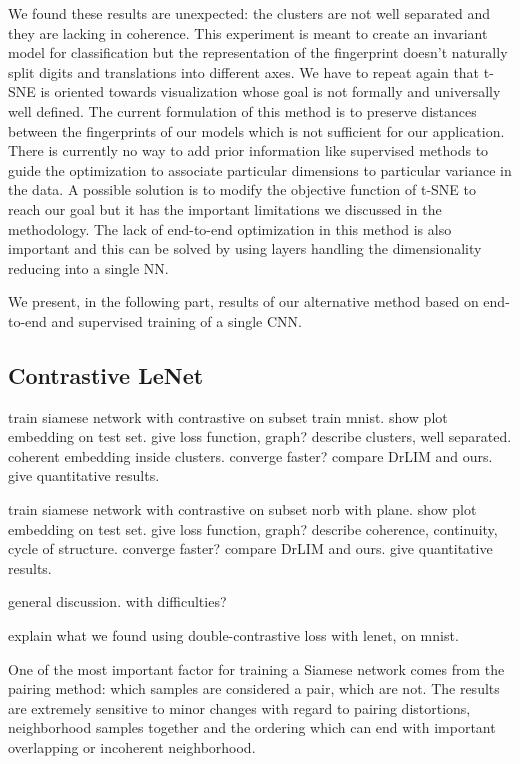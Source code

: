 \documentclass[a4paper,12pt]{report}
\begin{document}
We found these results are unexpected: the clusters are not well separated and they are lacking in coherence.
This experiment is meant to create an invariant model for classification but the representation of the fingerprint doesn't naturally split digits and translations into different axes.
We have to repeat again that t-SNE is oriented towards visualization whose goal is not formally and universally well defined.
The current formulation of this method is to preserve distances between the fingerprints of our models which is not sufficient for our application.
There is currently no way to add prior information like supervised methods to guide the optimization to associate particular dimensions to particular variance in the data.
A possible solution is to modify the objective function of t-SNE to reach our goal but it has the important limitations we discussed in the methodology.
The lack of end-to-end optimization in this method is also important and this can be solved by using layers handling the dimensionality reducing into a single NN.

We present, in the following part, results of our alternative method based on end-to-end and supervised training of a single CNN.

\subsection{Contrastive LeNet}

train siamese network with contrastive on subset train mnist.
show plot embedding on test set.
give loss function, graph?
describe clusters, well separated.
coherent embedding inside clusters.
converge faster?
compare DrLIM and ours.
give quantitative results.

train siamese network with contrastive on subset norb with plane.
show plot embedding on test set.
give loss function, graph?
describe coherence, continuity, cycle of structure.
converge faster?
compare DrLIM and ours.
give quantitative results.

general discussion.
with difficulties?

explain what we found using double-contrastive loss with lenet, on mnist.

One of the most important factor for training a Siamese network comes from the pairing method: which samples are considered a pair, which are not.
The results are extremely sensitive to minor changes with regard to pairing distortions, neighborhood samples together and the ordering which can end with important overlapping or incoherent neighborhood.
\end{document}
